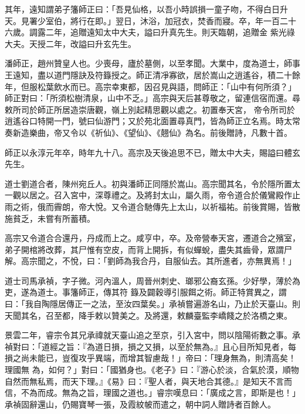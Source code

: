 \begin{pinyinscope}
 其年，遠知謂弟子籓師正曰：「吾見仙格，以吾小時誤損一童子吻，不得白日升天。見署少室伯，將行在即。」翌日，沐浴，加冠衣，焚香而寢。卒，年一百二十六歲。調露二年，追贈遠知太中大夫，謚曰升真先生。則天臨朝，追贈金
 紫光祿大夫。天授二年，改謚曰升玄先生。



 潘師正，趙州贊皇人也。少喪母，廬於墓側，以至孝聞。大業中，度為道士，師事王遠知，盡以道門隱訣及符籙授之。師正清凈寡欲，居於嵩山之逍遙谷，積二十餘年，但服松葉飲水而已。高宗幸東都，因召見與語，問師正：「山中有何所須？」師正對曰：「所須松樹清泉，山中不乏。」高宗與天后甚尊敬之，留連信宿而還。尋敕所司於師正所居造崇唐觀，嶺上別起精思觀以處之。初置奉天宮，
 帝令所司於逍遙谷口特開一門，號曰仙游門；又於苑北面置尋真門，皆為師正立名焉。時太常奏新造樂曲，帝又令以《祈仙》、《望仙》、《翹仙》為名。前後贈詩，凡數十首。



 師正以永淳元年卒，時年九十八。高宗及天後追思不已，贈太中大夫，賜謚曰體玄先生。



 道士劉道合者，陳州宛丘人。初與潘師正同隱於嵩山。高宗聞其名，令於隱所置太一觀以居之。召入宮中，深尊禮之。及將封太山，屬久雨，帝令道合於儀鸞殿作止
 雨之術，俄而霽朗，帝大悅。又令道合馳傳先上太山，以祈福祐。前後賞賜，皆散施貧乏，未嘗有所蓄積。



 高宗又令道合合還丹，丹成而上之。咸亨中，卒。及帝營奉天宮，遷道合之殯室，弟子開棺將改葬，其尸惟有空皮，而背上開拆，有似蟬蛻，盡失其齒骨，眾謂尸解。高宗聞之，不悅，曰：「劉師為我合丹，自服仙去。其所進者，亦無異焉！」



 道士司馬承禎，字子微。河內溫人，周晉州刺史、瑯邪公裔玄孫。少好學，薄於為吏，遂為道士。事籓師正，傳其符
 籙及闢穀導引服餌之術。師正特賞異之，謂曰：「我自陶隱居傳正一之法，至汝四葉矣。」承禎嘗遍游名山，乃止於天臺山。則天聞其名，召至都，降手敕以贊美之。及將還，敕麟臺監李嶠餞之於洛橋之東。



 景雲二年，睿宗令其兄承禕就天臺山追之至京，引入宮中，問以陰陽術數之事。承禎對曰：「道經之旨：『為道日損，損之又損，以至於無為。』且心目所知見者，每損之尚未能已，豈復攻乎異端，而增其智慮哉！」帝曰：「理身無為，則清高矣！理國無
 為，如何？」對曰：「國猶身也。《老子》曰：『游心於淡，合氣於漠，順物自然而無私焉，而天下理。』《易》曰：『聖人者，與天地合其德。』是知天不言而信，不為而成。無為之旨，理國之道也。」睿宗嘆息曰：「廣成之言，即斯是也！」承禎固辭還山，仍賜寶琴一張，及霞紋帔而遣之，朝中詞人贈詩者百餘人。




\end{pinyinscope}
